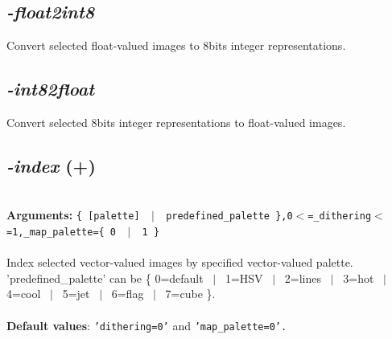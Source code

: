\documentclass[a4paper,11pt,twoside]{book}
\begin{document}
\subsection{\emph{-float2int8} }\vspace*{-0.5em}
Convert selected float-valued images to 8bits integer representations.


\subsection{\emph{-int82float} }\vspace*{-0.5em}
Convert selected 8bits integer representations to float-valued images.


\subsection{\emph{-index} (+)}\vspace*{-0.5em}
~\\\textbf{Arguments: } 
{\small \texttt{\{ [palette] ~$|$~ predefined\_palette \},0$<$=\_dithering$<$=1,\_map\_palette=\{ 0 ~$|$~ 1 \}}}\\~\\
Index selected vector-valued images by specified vector-valued palette.
~\\'predefined\_palette' can be \{ 0=default ~$|$~ 1=HSV ~$|$~ 2=lines ~$|$~ 3=hot ~$|$~ 4=cool ~$|$~ 5=jet ~$|$~ 6=flag ~$|$~ 7=cube \}.
~\\~\\\textbf{Default values}: {\small \texttt{'dithering=0'} and \texttt{'map\_palette=0'.}}
\end{document}
